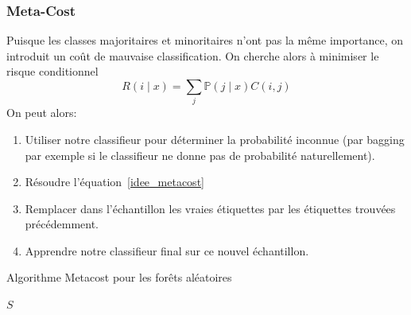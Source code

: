 \documentclass[dvipsnames,10pt]{beamer}
\DeclareMathOperator*{\argmin}{arg\,min}
\theoremstyle{plain}
\theoremstyle{definition}
\begin{document}
\begin{frame}
\frametitle{Meta-Cost}
Puisque les classes majoritaires et minoritaires n'ont pas la même importance, on introduit un coût de mauvaise classification. On cherche alors à minimiser le risque conditionnel 
\begin{equation}
    R ( i \mid x ) = \sum_j \mathbb{P} ( j \mid x ) C(i,j) \label{idee_metacost}
\end{equation}
On peut alors:
\begin{enumerate}
    \item Utiliser notre classifieur pour déterminer la probabilité inconnue (par bagging par exemple si le classifieur ne donne pas de probabilité naturellement).
    \item Résoudre l'équation~\ref{idee_metacost}
    \item Remplacer dans l'échantillon les vraies étiquettes par les étiquettes  trouvées précédemment.
    \item Apprendre notre classifieur final sur ce nouvel échantillon.
\end{enumerate}
\end{frame}

\begin{frame}[fragile]
\begin{algorithm}[H]
\caption{Algorithme Metacost pour les forêts aléatoires}\label{alg:metacost}
\begin{algorithmic}
    
    
            \Else {}
            \EndIf
        \EndFor
        \State{$y \gets \argmin_i \sum_j \hat{p}(j \mid x) C(i,j)$}
    \EndFor
    \State \Return $S$
    \EndProcedure
\end{algorithmic}    
\end{algorithm}
\end{frame}
\end{document}
